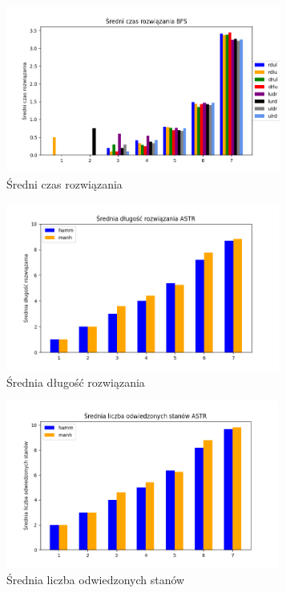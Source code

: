 \documentclass{classrep}
\begin{document}
{        \begin{figure}[!htbp]
            \centering
            \includegraphics[width=\textwidth, height=55mm]{wykresy/bfs5.png}
            \caption{Średni czas rozwiązania}
        \end{figure}
        \FloatBarrier

        

        \begin{figure}[!htbp]
            \centering
            \includegraphics[width=\textwidth, height=55mm]{wykresy/astr1.png}
            \caption{Średnia długość rozwiązania}
        \end{figure}

        \begin{figure}[!htbp]
            \centering
            \includegraphics[width=\textwidth, height=55mm]{wykresy/astr2.png}
            \caption{Średnia liczba odwiedzonych stanów}
        \end{figure}

}
\end{document}
